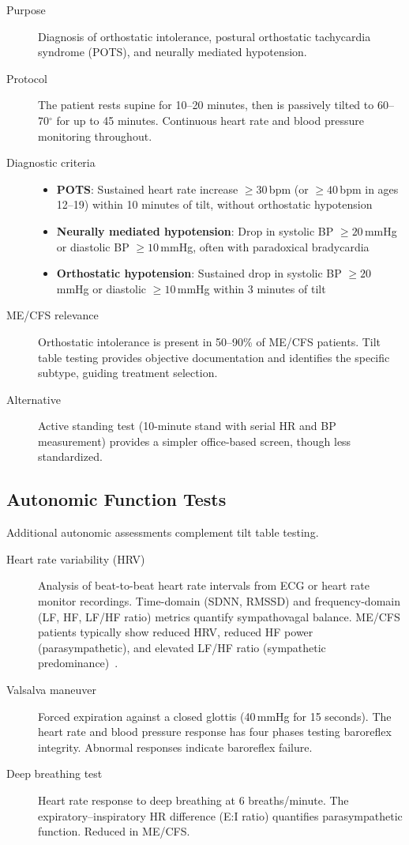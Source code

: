 \begin{description}
\item[Purpose] Diagnosis of orthostatic intolerance, postural orthostatic tachycardia syndrome (POTS), and neurally mediated hypotension.
\item[Protocol] The patient rests supine for 10--20 minutes, then is passively tilted to 60--70$^\circ$ for up to 45 minutes. Continuous heart rate and blood pressure monitoring throughout.
\item[Diagnostic criteria]
\begin{itemize}
    \item \textbf{POTS}: Sustained heart rate increase $\geq 30$\,bpm (or $\geq 40$\,bpm in ages 12--19) within 10 minutes of tilt, without orthostatic hypotension
    \item \textbf{Neurally mediated hypotension}: Drop in systolic BP $\geq 20$\,mmHg or diastolic BP $\geq 10$\,mmHg, often with paradoxical bradycardia
    \item \textbf{Orthostatic hypotension}: Sustained drop in systolic BP $\geq 20$\,mmHg or diastolic $\geq 10$\,mmHg within 3 minutes of tilt
\end{itemize}
\item[ME/CFS relevance] Orthostatic intolerance is present in 50--90\% of ME/CFS patients. Tilt table testing provides objective documentation and identifies the specific subtype, guiding treatment selection.
\item[Alternative] Active standing test (10-minute stand with serial HR and BP measurement) provides a simpler office-based screen, though less standardized.
\end{description}

\subsection{Autonomic Function Tests}

Additional autonomic assessments complement tilt table testing.

\begin{description}
\item[Heart rate variability (HRV)] Analysis of beat-to-beat heart rate intervals from ECG or heart rate monitor recordings. Time-domain (SDNN, RMSSD) and frequency-domain (LF, HF, LF/HF ratio) metrics quantify sympathovagal balance. ME/CFS patients typically show reduced HRV, reduced HF power (parasympathetic), and elevated LF/HF ratio (sympathetic predominance)~\cite{Newton2007}.
\item[Valsalva maneuver] Forced expiration against a closed glottis (40\,mmHg for 15 seconds). The heart rate and blood pressure response has four phases testing baroreflex integrity. Abnormal responses indicate baroreflex failure.
\item[Deep breathing test] Heart rate response to deep breathing at 6 breaths/minute. The expiratory--inspiratory HR difference (E:I ratio) quantifies parasympathetic function. Reduced in ME/CFS.
\end{description}

